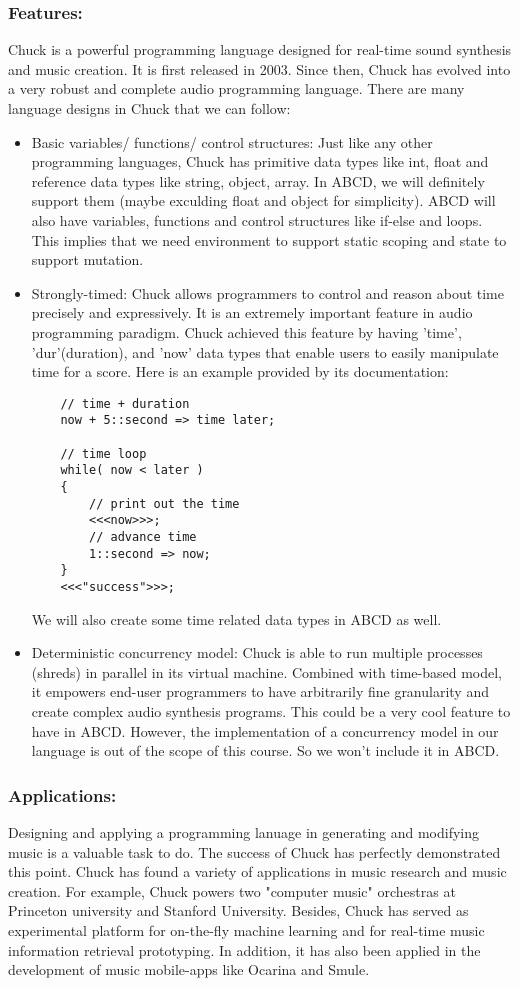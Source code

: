 	\subsubsection{Features:}
	Chuck is a powerful programming language designed for real-time sound synthesis and music creation\cite{WangCook02}. It is first released in 2003\cite{Wang15}. Since then, Chuck has evolved into a very robust and complete audio programming language. There are many language designs in Chuck that we can follow:
	\begin{itemize}
	\item Basic variables/ functions/ control structures: Just like any other programming languages, Chuck has primitive data types like int, float and reference data types like string, object, array. In ABCD, we will definitely support them (maybe exculding float and object for simplicity). ABCD will also have variables, functions and control structures like if-else and loops. This implies that we need environment to support static scoping and state to support mutation.
	\item Strongly-timed: Chuck allows programmers to control and reason about time precisely and expressively. It is an extremely important feature in audio programming paradigm. Chuck achieved this feature by having 'time', 'dur'(duration), and 'now' data types that enable users to easily manipulate time for a score. Here is an example provided by its documentation:
	\begin{verbatim}
	// time + duration
	now + 5::second => time later;

	// time loop
	while( now < later )
	{
    	// print out the time
    	<<<now>>>;
    	// advance time
    	1::second => now;
	}
	<<<"success">>>;
	\end{verbatim}
	We will also create some time related data types in ABCD as well.
	\item Deterministic concurrency model: Chuck is able to run multiple processes (shreds) in parallel in its virtual machine. Combined with time-based model, it empowers end-user programmers to have arbitrarily fine granularity and create complex audio synthesis programs. This could be a very cool feature to have in ABCD. However, the implementation of a concurrency model in our language is out of the scope of this course. So we won't include it in ABCD.
	\end{itemize}

	\subsubsection{Applications:}
	Designing and applying a programming lanuage in generating and modifying music is a valuable task to do. The success of Chuck has perfectly demonstrated this point. Chuck has found a variety of applications in music research and music creation. For example, Chuck powers two "computer music" orchestras at Princeton university and Stanford University. Besides, Chuck has served as experimental platform for on-the-fly machine learning and for real-time music information retrieval prototyping\cite{Wang15}. In addition, it has also been applied in the development of music mobile-apps like Ocarina and Smule\cite{Wang15}. 

